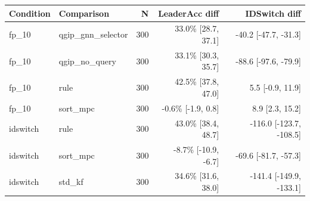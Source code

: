 \begin{tabular}{llrrr}
\toprule
\textbf{Condition} & \textbf{Comparison} & \textbf{N} & \textbf{LeaderAcc diff} & \textbf{IDSwitch diff} \\
\midrule
fp\_10 & qgip\_gnn\_selector & 300 & 33.0\% [28.7, 37.1] & -40.2 [-47.7, -31.3] \\
fp\_10 & qgip\_no\_query & 300 & 33.1\% [30.3, 35.7] & -88.6 [-97.6, -79.9] \\
fp\_10 & rule & 300 & 42.5\% [37.8, 47.0] & 5.5 [-0.9, 11.9] \\
fp\_10 & sort\_mpc & 300 & -0.6\% [-1.9, 0.8] & 8.9 [2.3, 15.2] \\
idswitch & rule & 300 & 43.0\% [38.4, 48.7] & -116.0 [-123.7, -108.5] \\
idswitch & sort\_mpc & 300 & -8.7\% [-10.9, -6.7] & -69.6 [-81.7, -57.3] \\
idswitch & std\_kf & 300 & 34.6\% [31.6, 38.0] & -141.4 [-149.9, -133.1] \\
\bottomrule
\end{tabular}
